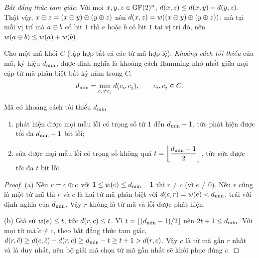 \emph{Bất đẳng thức tam giác.} Với mọi $x, y, z \in \mathrm{GF}(2)^{n}$,
$d(x,z) \le d(x,y) + d(y,z)$. Thật vậy,
$x \oplus z = (x \oplus y) \oplus (y \oplus z)$ nên
$d(x,z) = w((x \oplus y) \oplus (y \oplus z))$; mà tại mỗi vị trí mà
$a \oplus b$ có bit $1$ thì $a$ hoặc $b$ có bit $1$ tại vị trí đó, nên
$w(a \oplus b) \le w(a) + w(b)$.


Cho một mã khối $C$ (tập hợp tất cả các từ mã hợp lệ). \emph{Khoảng cách tối
thiểu} của mã, ký hiệu $d_{\min}$, được định nghĩa là khoảng cách Hamming nhỏ nhất
giữa mọi cặp từ mã phân biệt bất kỳ nằm trong $C$:
\[
  d_{\min} = \min_{c_i \neq c_j} d(c_i,c_j),
  \qquad c_i, c_j \in C .
\]

\begin{dinhly}\label{dl:phathien-sua}
Mã có khoảng cách tối thiểu $d_{\min}$
\begin{enumerate}[label=(\alph*)]
  \item phát hiện được mọi mẫu lỗi có trọng số từ $1$ đến $d_{\min} - 1$, tức
        phát hiện được tối đa $d_{\min} - 1$ bit lỗi;
  \item sửa được mọi mẫu lỗi có trọng số không quá
        $t = \left\lfloor \dfrac{d_{\min} - 1}{2} \right\rfloor$, tức sửa được tối
        đa $t$ bit lỗi.
\end{enumerate}
\end{dinhly}
\begin{proof}

(a) Nếu $r = c \oplus e$ với $1 \le w(e) \le d_{\min} - 1$ thì
$r \neq c$ (vì $e \neq 0$). Nếu $r$ cũng là một từ mã thì $r$ và $c$ là hai từ
mã phân biệt với $d(c,r) = w(e) < d_{\min}$, trái với định nghĩa của
$d_{\min}$. Vậy $r$ không là từ mã và lỗi được phát hiện.

(b) Giả sử $w(e) \le t$, tức $d(r,c) \le t$. Vì
$t = \lfloor (d_{\min} - 1)/2 \rfloor$ nên $2t + 1 \le d_{\min}$. Với mọi từ mã
$\tilde{c} \neq c$, theo bất đẳng thức tam giác,
$d(r,\tilde{c}) \ge d(c,\tilde{c}) - d(r,c) \ge d_{\min} - t \ge t + 1
> d(r,c)$. Vậy $c$ là từ mã gần $r$ nhất và là duy nhất, nên bộ giải mã
chọn từ mã gần nhất sẽ khôi phục đúng $c$.
\end{proof}

